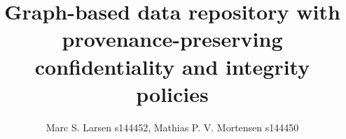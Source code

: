 

\setcounter{secnumdepth}{0}

\title{Graph-based data repository with provenance-preserving confidentiality and integrity policies} 
\author{Marc S. Larsen s144452, Mathias P. V. Mortensen s144450}
\date{\vspace{-5ex}}



\maketitle
\nocite{*}








